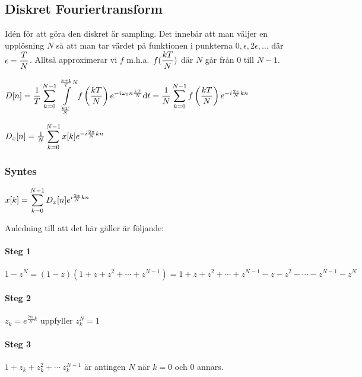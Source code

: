 \documentclass[a4paper]{article}
\begin{document}
\providecommand\fname{}
\renewcommand\fname{19-09-17}

\subsection{Diskret Fouriertransform}
Idén för att göra den diskret är sampling. Det innebär att man väljer en 
upplösning \(
    N
\) så att man tar värdet på funktionen i punkterna \(
    0, \epsilon, 2\epsilon, \dots
\) där \(
    \epsilon = \displaystyle\frac{T}{N} 
\). Alltså approximerar vi \(
    f
\) m.h.a.\ \(
    f(\displaystyle\frac{kT}{N} )
\) där \(
    N
\) går från \(
    0
\) till \(
    N-1
\).

\begin{ansats}
    \(
        D[n] = \displaystyle\frac{1}{T} \displaystyle\sum_{k=0}^{N-1} \displaystyle\int\limits_\frac{kT}{N}^{\frac{k+1}{T} N} f\left(\frac{kT}{N}\right) e^{-i\omega_0 n \frac{kT}{N}} \dd t
        = \displaystyle\frac{1}{N} \displaystyle\sum_{k=0}^{N-1} f\left(\frac{kT}{N}\right) e^{-i \frac{2\pi}{N}kn}
    \)  
\end{ansats}

\(
    D_x[n] = \frac{1}{N} \displaystyle\sum_{k=0}^{N-1} x[k] e^{-i \frac{2\pi}{N}kn}
\) 

\subsubsection{Syntes}
\(
    x[k] = \displaystyle\sum_{k=0}^{N-1} D_x[n] e^{i \frac{2\pi}{N}kn}
\) 


Anledning till att det här gäller är följande:
\paragraph{Steg 1}
\(
    1-z^{N} = (1-z)(1+z+z^2+\cdots + z^{N-1}) = 1+z+z^2+\cdots+z^{N-1}-z-z^2-\cdots-z^{N-1}-z^{N}
\) 

\paragraph{Steg 2}
\(
    z_k = e^{\frac{2\pi i}{N}k}
\) uppfyller \(
    z_k^N = 1
\) 

\paragraph{Steg 3}
\(
    1 + z_k + z_k^2 + \cdots \ z_k^{N-1}
\) är antingen \(
    N
\) när \(
    k = 0
\) och \(
    0
\) annars.
\end{document}
